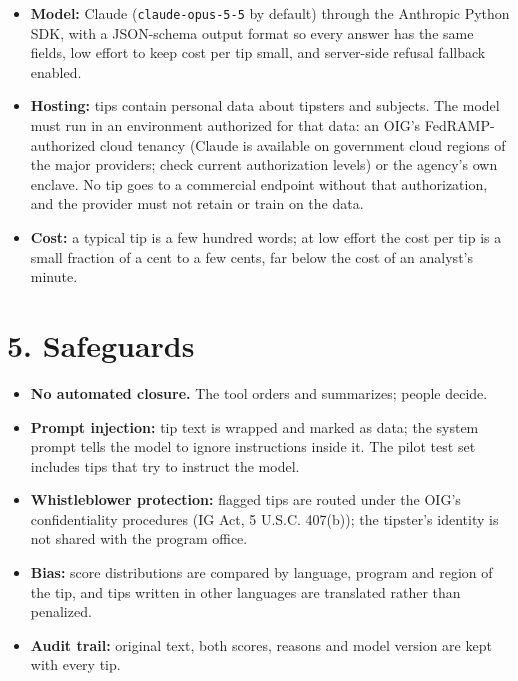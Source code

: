 \documentclass[letterpaper,11pt]{article}
\providecommand{\tightlist}{\setlength{\itemsep}{0pt}\setlength{\parskip}{0pt}}
\begin{document}
\begin{itemize}
\tightlist
\item
  \textbf{Model:} Claude (\texttt{claude-opus-5-5} by default) through
  the Anthropic Python SDK, with a JSON-schema output format so every
  answer has the same fields, low effort to keep cost per tip small, and
  server-side refusal fallback enabled.
\item
  \textbf{Hosting:} tips contain personal data about tipsters and
  subjects. The model must run in an environment authorized for that
  data: an OIG's FedRAMP-authorized cloud tenancy (Claude is available
  on government cloud regions of the major providers; check current
  authorization levels) or the agency's own enclave. No tip goes to a
  commercial endpoint without that authorization, and the provider must
  not retain or train on the data.
\item
  \textbf{Cost:} a typical tip is a few hundred words; at low effort the
  cost per tip is a small fraction of a cent to a few cents, far below
  the cost of an analyst's minute.
\end{itemize}

\hypertarget{safeguards}{%
\section*{5. Safeguards}\label{safeguards}}

\begin{itemize}
\tightlist
\item
  \textbf{No automated closure.} The tool orders and summarizes; people
  decide.
\item
  \textbf{Prompt injection:} tip text is wrapped and marked as data; the
  system prompt tells the model to ignore instructions inside it. The
  pilot test set includes tips that try to instruct the model.
\item
  \textbf{Whistleblower protection:} flagged tips are routed under the
  OIG's confidentiality procedures (IG Act, 5 U.S.C. 407(b)); the
  tipster's identity is not shared with the program office.
\item
  \textbf{Bias:} score distributions are compared by language, program
  and region of the tip, and tips written in other languages are
  translated rather than penalized.
\item
  \textbf{Audit trail:} original text, both scores, reasons and model
  version are kept with every tip.
\end{itemize}
\end{document}
